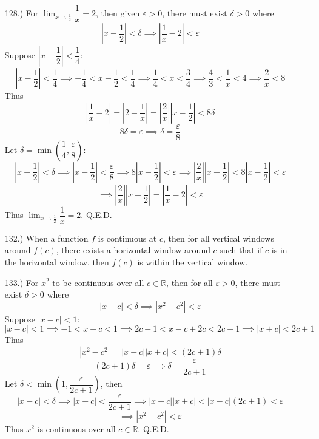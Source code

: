 \documentclass[12pt]{article}
\newcommand{\vertb}[1]{\left\vert#1\right\vert}
\newcommand{\parns}[1]{\left(#1\right)}
\newcommand{\e}{\varepsilon}
\newcommand{\lm}[1]{\displaystyle\lim_{#1}}
\begin{document}
\begin{itemize}
    \item [128.)] For $\lm{x\to\frac{1}{2}}\dfrac{1}{x}=2$, then given $\e>0$, there must exist $\delta>0$ where
    \[\vertb{x-\frac{1}{2}}<\delta\implies\vertb{\frac{1}{x}-2}<\e\]
    Suppose $\vertb{x-\dfrac{1}{2}}<\dfrac{1}{4}$:
    \[\vertb{x-\frac{1}{2}}<\frac{1}{4}\implies-\frac{1}{4}<x-\frac{1}{2}<\frac{1}{4}\implies\frac{1}{4}<x<\frac{3}{4}\implies\frac{4}{3}<\frac{1}{x}<4\implies\frac{2}{x}<8\]
    Thus
    \[\vertb{\frac{1}{x}-2}=\vertb{2-\frac{1}{x}}=\vertb{\frac{2}{x}}\vertb{x-\frac{1}{2}}<8\delta\]
    \[8\delta=\e\implies\delta=\frac{\e}{8}\]
    Let $\delta=\min\parns{\dfrac{1}{4},\dfrac{\e}{8}}$:
    \[\vertb{x-\frac{1}{2}}<\delta\implies\vertb{x-\frac{1}{2}}<\frac{\e}{8}\implies8\vertb{x-\frac{1}{2}}<\e\implies\vertb{\frac{2}{x}}\vertb{x-\frac{1}{2}}<8\vertb{x-\frac{1}{2}}<\e\]
    \[\implies\vertb{\frac{2}{x}}\vertb{x-\frac{1}{2}}=\vertb{\frac{1}{x}-2}<\e\]
    Thus $\lm{x\to\frac{1}{2}}\dfrac{1}{x}=2$. Q.E.D.



    \item [132.)] When a function $f$ is continuous at $c$, then for all vertical windows around $f(c)$, there exists a horizontal window around $c$ such that if $c$ is in the horizontal window, then $f(c)$ is within the vertical window.

    \item [133.)] For $x^2$ to be continuous over all $c\in\mathbb{R}$, then for all $\e>0$, there must exist $\delta>0$ where
    \[\vertb{x-c}<\delta\implies\vertb{x^2-c^2}<\e\]
    Suppose $\vertb{x-c}<1$:
    \[\vertb{x-c}<1\implies-1<x-c<1\implies 2c-1<x-c+2c<2c+1\implies\vertb{x+c}<2c+1\]
    Thus
    \[\vertb{x^2-c^2}=\vertb{x-c}\vertb{x+c}<(2c+1)\delta\]
    \[(2c+1)\delta=\e\implies\delta=\frac{\e}{2c+1}\]
    Let $\delta<\min\parns{1,\dfrac{\e}{2c+1}}$, then
    \[\vertb{x-c}<\delta\implies\vertb{x-c}<\frac{\e}{2c+1}\implies\vertb{x-c}\vertb{x+c}<\vertb{x-c}(2c+1)<\e\]
    \[\implies\vertb{x^2-c^2}<\e\]
    Thus $x^2$ is continuous over all $c\in\mathbb{R}$. Q.E.D.


\end{itemize}
\end{document}
